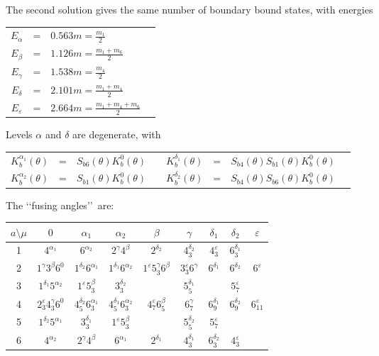\documentclass[a4paper,12pt]{report}
\begin{document}
The second solution gives the same number of boundary bound states, with energies
\begin{center}
\begin{tabular}{cclc|}
$E_{\alpha}$ &=& $0.563 m =\frac{m_{1}}{2}$ \\
$E_{\beta}$ &=& $1.126 m =\frac{m_{1}+m_{6}}{2}$ \\
$E_{\gamma}$ &=& $1.538 m =\frac{m_{4}}{2}$ \\
$E_{\delta}$ &=& $2.101 m =\frac{m_{1}+m_{4}}{2}$ \\
$E_{\varepsilon}$ &=& $2.664 m =\frac{m_{1}+m_{4}+m_{6}}{2}$ \\
\end{tabular}
\end{center}
Levels $\alpha$ and $\delta$ are degenerate, with
\begin{center}
\begin{tabular}{cclc|cclc|}
$K_{b}^{\alpha_{1}}(\theta)$ &=& $S_{b6}(\theta)K_{b}^{0}(\theta)$ && $K_{b}^{\delta_{1}}(\theta)$ &=& $S_{b4}(\theta)S_{b1}(\theta)K_{b}^{0}(\theta)$ \\
$K_{b}^{\alpha_{2}}(\theta)$ &=& $S_{b1}(\theta)K_{b}^{0}(\theta)$ && $K_{b}^{\delta_{2}}(\theta)$ &=& $S_{b4}(\theta)S_{b6}(\theta)K_{b}^{0}(\theta)$ \\
\end{tabular}
\end{center}

The \lq\lq fusing angles\rq\rq \, are:

\begin{center}
\begin{tabular}{|c|c|c|c|c|c|c|c|c|}\hline
 $ a\setminus\mu$  &  $ 0$  &  $ \alpha_{1}$ & $ \alpha_{2}$ & $ \beta$ &  $ \gamma$ & $\delta_{1}$ & $\delta_{2}$ &$\varepsilon$  \\ \hline
 1 & $4^{\alpha_{1}}$ & $6^{\alpha_{2}}$& $2^{\gamma}4^{\beta}$& $2^{\delta_{2}}$& $4_{3}^{\delta_{2}}$& $4_{3}^{\varepsilon}$& $6_{3}^{\delta_{1}}$&  \\ \hline
 2 & $1^{\gamma}3^{\beta}6^{0}$ & $1^{\delta_{2}}6^{\alpha_{1}}$ & $1^{\delta_{1}}6^{\alpha_{2}}$& $1^{\varepsilon}5_{3}^{\gamma}6^{\beta}$& $3_{3}^{\varepsilon}6^{\gamma}$& $6^{\delta_{1}}$& $6^{\delta_{2}}$& $6^{\varepsilon}$\\ \hline
 3 & $1^{\delta_{1}}5^{\alpha_{2}}$ & $1^{\varepsilon}5_{3}^{\beta}$ & $3_{3}^{\delta_{2}}$ & & $5_{5}^{\delta_{1}}$ & &$5_{7}^{\varepsilon}$ & \\ \hline
 4 & $2_{3}^{\varepsilon}4_{3}^{\gamma}6^{0}$& $4_{5}^{\delta_{2}}6_{3}^{\alpha_{1}}$ & $4_{5}^{\delta_{1}}6_{3}^{\alpha_{2}}$ & $4_{7}^{\varepsilon}6_{5}^{\beta}$& $6_{7}^{\gamma}$& $6_{9}^{\delta_{1}}$& $6_{9}^{\delta_{2}}$& $6_{11}^{\varepsilon}$\\ \hline
 5 & $1^{\delta_{2}}5^{\alpha_{1}}$ & $3_{3}^{\delta_{1}}$ & $1^{\varepsilon}5_{3}^{\beta}$ & & $5_{5}^{\delta_{2}}$ & $5_{7}^{\varepsilon}$ & & \\ \hline
 6 & $4^{\alpha_{2}}$ & $2^{\gamma}4^{\beta}$& $6^{\alpha_{1}}$& $2^{\delta_{1}}$& $4_{3}^{\delta_{1}}$& $6_{3}^{\delta_{2}}$&$4_{3}^{\varepsilon}$ &  \\ \hline
\end{tabular}
\end{center}
\end{document}
